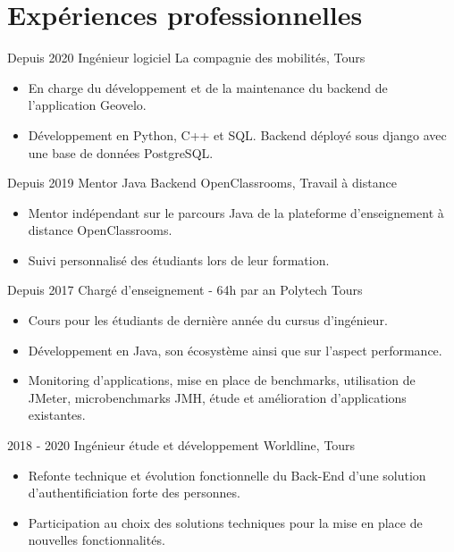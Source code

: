 \documentclass[]{friggeri-cv}
\begin{document}
\section{Expériences professionnelles}
\vspace{-5pt}
\begin{entrylist}
  \entry
  {Depuis 2020}
    {Ingénieur logiciel}
    {La compagnie des mobilités, Tours}
    {
    \vspace{-0.8\baselineskip}
	\begin{itemize}[leftmargin=*]
		\item En charge du développement et de la maintenance du backend de l'application Geovelo.
		\item Développement en Python, C++ et SQL. Backend déployé sous django avec une base de données PostgreSQL.
	\end{itemize}
	}
      \entry
    {Depuis 2019}
    {Mentor Java Backend}
    {OpenClassrooms, Travail à distance}
    {
    \vspace{-0.8\baselineskip}
	\begin{itemize}[leftmargin=*]
		\item Mentor indépendant sur le parcours Java de la plateforme d'enseignement à distance OpenClassrooms.
		\item  Suivi personnalisé des étudiants lors de leur formation. 
	\end{itemize}
	}
  \entry
    {Depuis 2017}
    {Chargé d'enseignement - 64h par an}
    {Polytech Tours}
    {
    \vspace{-0.8\baselineskip}
	\begin{itemize}[leftmargin=*]
		\item Cours pour les étudiants de dernière année du cursus d'ingénieur.
		\item Développement en Java, son écosystème ainsi que sur l'aspect performance.
		\item Monitoring d'applications, mise en place de benchmarks, utilisation de JMeter, microbenchmarks JMH, étude et amélioration d'applications existantes.
	\end{itemize}
	}
    \entry
    {2018 - 2020}
    {Ingénieur étude et développement}
    {Worldline, Tours}
    {
    \vspace{-0.8\baselineskip}
	\begin{itemize}[leftmargin=*]
		\item Refonte technique et évolution fonctionnelle du Back-End d'une solution d'authentificiation forte des personnes.
		\item Participation au choix des solutions techniques pour la mise en place de nouvelles fonctionnalités.

\end{itemize}}
\end{entrylist}
\end{document}
